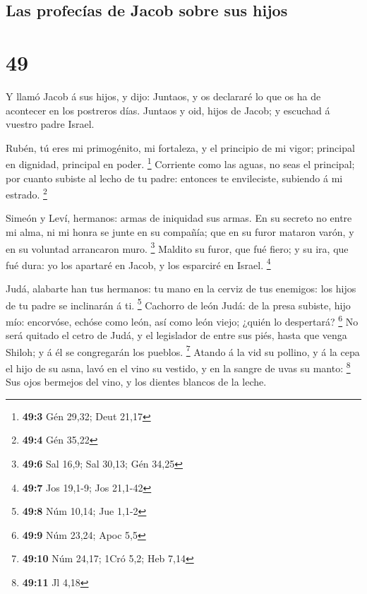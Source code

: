 \hypertarget{las-profecuxedas-de-jacob-sobre-sus-hijos}{%
\subsection{Las profecías de Jacob sobre sus
hijos}\label{las-profecuxedas-de-jacob-sobre-sus-hijos}}

\hypertarget{section-48}{%
\section{49}\label{section-48}}

 Y llamó Jacob á sus hijos, y dijo: Juntaos, y os
declararé lo que os ha de acontecer en los postreros días.
 Juntaos y oid, hijos de Jacob; y escuchad á vuestro padre
Israel.

 Rubén, tú eres mi primogénito, mi fortaleza, y el
principio de mi vigor; principal en dignidad, principal en poder.
\footnote{\textbf{49:3} Gén 29,32; Deut 21,17}  Corriente
como las aguas, no seas el principal; por cuanto subiste al lecho de tu
padre: entonces te envileciste, subiendo á mi estrado. \footnote{\textbf{49:4}
  Gén 35,22}

 Simeón y Leví, hermanos: armas de iniquidad sus armas.
 En su secreto no entre mi alma, ni mi honra se junte en
su compañía; que en su furor mataron varón, y en su voluntad arrancaron
muro. \footnote{\textbf{49:6} Sal 16,9; Sal 30,13; Gén 34,25}
 Maldito su furor, que fué fiero; y su ira, que fué dura:
yo los apartaré en Jacob, y los esparciré en Israel. \footnote{\textbf{49:7}
  Jos 19,1-9; Jos 21,1-42}

 Judá, alabarte han tus hermanos: tu mano en la cerviz de
tus enemigos: los hijos de tu padre se inclinarán á ti. \footnote{\textbf{49:8}
  Núm 10,14; Jue 1,1-2}  Cachorro de león Judá: de la
presa subiste, hijo mío: encorvóse, echóse como león, así como león
viejo; ¿quién lo despertará? \footnote{\textbf{49:9} Núm 23,24; Apoc 5,5}
 No será quitado el cetro de Judá, y el legislador de
entre sus piés, hasta que venga Shiloh; y á él se congregarán los
pueblos. \footnote{\textbf{49:10} Núm 24,17; 1Cró 5,2; Heb 7,14}
 Atando á la vid su pollino, y á la cepa el hijo de su
asna, lavó en el vino su vestido, y en la sangre de uvas su manto:
\footnote{\textbf{49:11} Jl 4,18}  Sus ojos bermejos del
vino, y los dientes blancos de la leche.

